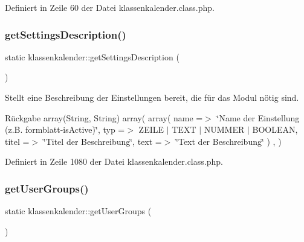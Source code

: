 Definiert in Zeile 60 der Datei klassenkalender.\+class.\+php.

\mbox{\label{classklassenkalender_a37e40b207b67a98131fbcc95f928b2f9}} 
\subsubsection{\texorpdfstring{get\+Settings\+Description()}{getSettingsDescription()}}
{\footnotesize\ttfamily static klassenkalender\+::get\+Settings\+Description (\begin{DoxyParamCaption}{ }\end{DoxyParamCaption})\hspace{0.3cm}{\ttfamily [static]}}

Stellt eine Beschreibung der Einstellungen bereit, die für das Modul nötig sind. \begin{DoxyReturn}{Rückgabe}
array(\+String, String) array( array( \textquotesingle{}name\textquotesingle{} =$>$ \char`\"{}\+Name der Einstellung (z.\+B. formblatt-\/is\+Active)\char`\"{}, \textquotesingle{}typ\textquotesingle{} =$>$ Z\+E\+I\+LE $\vert$ T\+E\+XT $\vert$ N\+U\+M\+M\+ER $\vert$ B\+O\+O\+L\+E\+AN, \textquotesingle{}titel\textquotesingle{} =$>$ \char`\"{}\+Titel der Beschreibung\char`\"{}, \textquotesingle{}text\textquotesingle{} =$>$ \char`\"{}\+Text der Beschreibung\char`\"{} ) , ) 
\end{DoxyReturn}


Definiert in Zeile 1080 der Datei klassenkalender.\+class.\+php.

\mbox{\label{classklassenkalender_adc32be61b75209d170e29f990c104bcf}} 
\subsubsection{\texorpdfstring{get\+User\+Groups()}{getUserGroups()}}
{\footnotesize\ttfamily static klassenkalender\+::get\+User\+Groups (\begin{DoxyParamCaption}{ }\end{DoxyParamCaption})\hspace{0.3cm}{\ttfamily [static]}}

